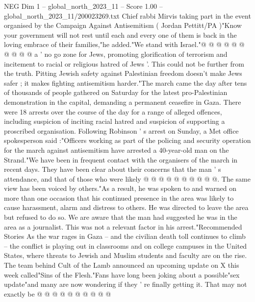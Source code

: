 \begin{textsample}{NEG Dim 1 – global\_north\_2023\_11 – Score 1.00 – global\_north\_2023\_11/200023269.txt}
Chief rabbi Mirvis taking part in the event organised by the Campaign Against Antisemitism ( Jordan Pettitt/PA )"Know your government will not rest until each and every one of them is back in the loving embrace of their families,"he added."We stand with Israel."@ @ @ @ @ @ @ @ @ @ a ' no go zone for Jews, promoting glorification of terrorism and incitement to racial or religious hatred of Jews '.
This could not be further from the truth.
Pitting Jewish safety against Palestinian freedom doesn't make Jews safer ; it makes fighting antisemitism harder."The march came the day after tens of thousands of people gathered on Saturday for the latest pro-Palestinian demonstration in the capital, demanding a permanent ceasefire in Gaza.
There were 18 arrests over the course of the day for a range of alleged offences, including suspicion of inciting racial hatred and suspicion of supporting a proscribed organisation.
Following Robinson ' s arrest on Sunday, a Met office spokesperson said :"Officers working as part of the policing and security operation for the march against antisemitism have arrested a 40-year-old man on the Strand."We have been in frequent contact with the organisers of the march in recent days.
They have been clear about their concerns that the man ' s attendance, and that of those who were likely @ @ @ @ @ @ @ @ @ @.
The same view has been voiced by others."As a result, he was spoken to and warned on more than one occasion that his continued presence in the area was likely to cause harassment, alarm and distress to others.
He was directed to leave the area but refused to do so.
We are aware that the man had suggested he was in the area as a journalist.
This was not a relevant factor in his arrest."Recommended Stories As the war rages in Gaza -- and the civilian death toll continues to climb -- the conflict is playing out in classrooms and on college campuses in the United States, where threats to Jewish and Muslim students and faculty are on the rise.
The team behind Cult of the Lamb announced an upcoming update on X this week called"Sins of the Flesh."Fans have long been joking about a possible"sex update"and many are now wondering if they ' re finally getting it.
That may not exactly be @ @ @ @ @ @ @ @ @ @

\end{textsample}
